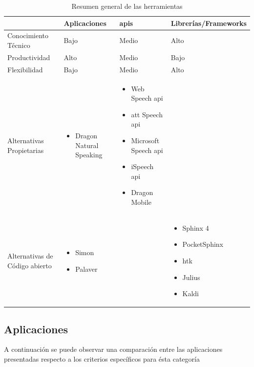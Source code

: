 \begin{table}[H]
\centering
\footnotesize
\begin{tabular}{|p{3.5cm}|>{\centering}p{3.5cm}|>{\centering}p{3.5cm}|>{\centering}p{3.5cm}|}
\hline
                               & Aplicaciones             &  \gls{api}s                            & Librer\'ias/Frameworks \tabularnewline
\hline
Conocimiento T\'ecnico         &     Bajo                    & Medio                            & Alto    \tabularnewline
Productividad                  &     Alto                    & Medio                            & Bajo    \tabularnewline
Flexibilidad                   &     Bajo                    & Medio                            & Alto    \tabularnewline
Alternativas Propietarias      & \begin{itemize} \item Dragon Natural Speaking \end{itemize}  & \begin{itemize} \item Web Speech \gls{api} \item \gls{att} Speech \gls{api} \item Microsoft Speech \gls{api} \item iSpeech \gls{api} \item Dragon Mobile \end{itemize}  &  \tabularnewline
Alternativas de Código abierto & \begin{itemize} \item Simon \item Palaver \end{itemize}          &                                  & \begin{itemize} \item Sphinx 4 \item PocketSphinx \item \gls{htk} \item Julius \item Kaldi \end{itemize} \tabularnewline
\hline
\end{tabular}
\caption{Resumen general de las herramientas}
\label{sec:resumen-herramientas}
\end{table}

\subsection{Aplicaciones}

A continuaci\'on se puede observar una comparaci\'on entre las aplicaciones presentadas respecto a los criterios espec\'ificos
para \'esta categor\'ia


